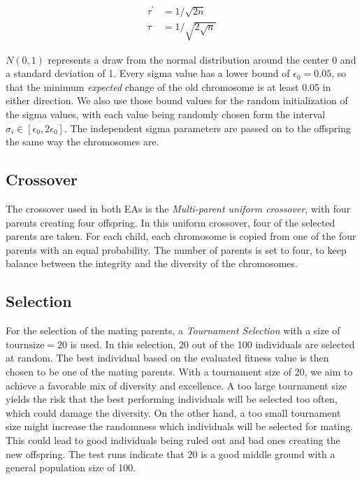 \begin{center}
\begin{align*}
\tau^{\prime} &= 1 / \sqrt{2 n} \\
\tau &= 1 / \sqrt{2 \sqrt{n}}
\end{align*}
\end{center}
$N(0,1)$ represents a draw from the normal distribution around the center $0$ and a standard deviation of 1.
Every sigma value has a lower bound of $\epsilon_0 = 0.05$, so that the minimum \emph{expected} change of the old chromosome is at least 0.05 in either direction. We also use those bound values for the random initialization of the sigma values, with each value being randomly chosen form the interval $\sigma_i \in [\epsilon_0, 2\epsilon_0]$. The independent sigma parameters are passed on to the offspring the same way the chromosomes are. 

\subsection{Crossover}

The crossover used in both EAs is the \emph{Multi-parent uniform crossover}, with four parents creating four offspring. In this uniform crossover, four of the selected parents are taken. For each child, each chromosome is copied from one of the four parents with an equal probability. The number of parents is set to four, to keep balance between the integrity and the diversity of the chromosomes.

\subsection{Selection}
For the selection of the mating parents, a \emph{Tournament Selection} with a size of $\text{tournsize} = 20$ is used. In this selection, 20 out of the 100 individuals are selected at random. The best individual based on the evaluated fitness value is then chosen to be one of the mating parents. With a tournament size of 20, we aim to achieve a favorable mix of diversity and excellence. 
A too large tournament size yields the risk that the best performing individuals will be selected too often, which could damage the diversity.
On the other hand, a too small tournament size might increase the randomness which individuals will be selected for mating.
This could lead to good individuals being ruled out and bad ones creating the new offspring. The test runs indicate that 20 is a good middle ground with a general population size of 100.
